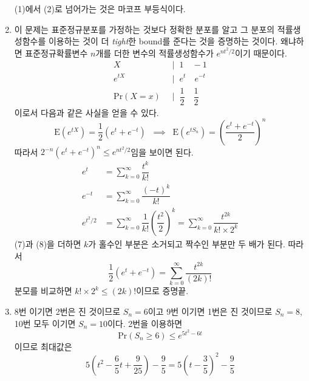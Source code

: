 \documentclass[answers]{exam}
\begin{document}
\begin{questions}
\begin{solution}
\begin{enumerate}
      (1)에서 (2)로 넘어가는 것은 마코프 부등식이다.
      \item 이 문제는 표준정규분포를 가정하는 것보다 정확한 분포를 알고 그 분포의 적률생성함수를 이용하는 것이 더 \emph{tight}한 bound를 준다는 것을 증명하는 것이다. 왜냐하면 표준정규확률변수 $n$개를 더한 변수의 적률생성함수가 $e^{nt^{2}/2}$이기 때문이다.
      \begin{align}
        X\;\;&|\;\; 1 \quad -1\\
        e^{tX}\;\;&|\;\;e^{t}\quad e^{-t}\\
        \mathrm{Pr}\left(X=x\right)\;\;&\Big|\;\; \dfrac{1}{2}\quad \dfrac{1}{2}
      \end{align}
      이로서 다음과 같은 사실을 얻을 수 있다.
      \begin{equation}
        \mathrm{E}\left(e^{tX}\right)= \dfrac{1}{2}\left(e^{t}+e^{-t}\right) \;\;\implies\;\; \mathrm{E}\left(e^{tS_{n}}\right)=\left(\dfrac{e^{t}+e^{-t}}{2}\right)^{n}
      \end{equation}
      따라서 $2^{-n}\left(e^{t}+e^{-t}\right)^{n}\leq e^{nt^{2}/2}$임을 보이면 된다.
      \begin{align}
        e^{t} &= \sum_{k=0}^{\infty}\dfrac{t^{k}}{k!}\\
        e^{-t} &= \sum_{k=0}^{\infty}\dfrac{\left(-t\right)^{k}}{k!}\\
        e^{t^{2}/2}&= \sum_{k=0}^{\infty}\dfrac{1}{k!}\left(\dfrac{t^{2}}{2}\right)^{k} = \sum_{k=0}^{\infty}\dfrac{t^{2k}}{k!\times 2^{k}}
      \end{align}
      (7)과 (8)을 더하면 $k$가 홀수인 부분은 소거되고 짝수인 부분만 두 배가 된다. 따라서
      \begin{equation}
        \dfrac{1}{2}\left(e^{t}+e^{-t}\right) = \sum_{k=0}^{\infty}\dfrac{t^{2k}}{\left(2k\right)!}
      \end{equation}
      분모를 비교하면 $k!\times 2^{k}\leq\left(2k\right)!$이므로 증명끝.
      \item 8번 이기면 2번은 진 것이므로 $S_{n}=6$이고 9번 이기면 1번은 진 것이므로 $S_{n}=8$, 10번 모두 이기면 $S_{n}=10$이다. 2번을 이용하면
      \begin{equation}
        \mathrm{Pr}\left(S_{n}\geq 6\right)\leq e^{5t^{2}-6t}
      \end{equation}
      이므로 최대값은
      \begin{equation}
        5\left(t^{2}-\dfrac{6}{5}t+\dfrac{9}{25}\right)-\dfrac{9}{5} = 5\left(t-\dfrac{3}{5}\right)^{2}-\dfrac{9}{5}
      \end{equation}

\end{enumerate}
\end{solution}
\end{questions}
\end{document}
